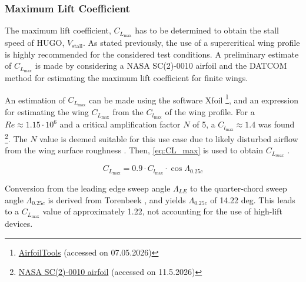 \subsubsection*{Maximum Lift Coefficient}
The maximum lift coefficient, $C_{L_\text{max}}$ has to be determined to obtain the stall speed of HUGO, $V_\text{stall}$. As stated previously, the use of a supercritical wing profile is highly recommended for the considered test conditions. A preliminary estimate of  $C_{L_\text{max}}$ is made by considering a NASA SC(2)-0010 airfoil and the DATCOM method for estimating the maximum lift coefficient for finite wings. 

An estimation of $C_{L_\text{max}}$ can be made using the software Xfoil \footnote{\href{http://airfoiltools.com/polar/details?polar=xf-sc20412-il-500000-n5}{AirfoilTools} (accessed on 07.05.2026)}, and an expression for estimating the wing $C_{L_\text{max}}$ from the $C_{l_\text{max}}$ of the wing profile. For a $Re \approx 1.15\cdot10^6$ and a critical amplification factor $N$ of 5, a $C_{l_\text{max}} \approx 1.4$ was found \footnote{\href{http://www.airfoiltools.com/polar/details?polar=xf-sc20010-il-1000000-n5}{NASA SC(2)-0010 airfoil} (accessed on 11.5.2026)}. The $N$ value is deemed suitable for this use case due to likely disturbed airflow from the wing surface roughness \cite{Koul}. Then, \autoref{eq:CL_max} is used to obtain $C_{L_{max}}$ \cite[p. 153]{Torenbeek1982}.

\begin{equation}
    C_{L_{\max}} = 0.9 \cdot C_{l_{\max}} \cdot \cos\Lambda_{0.25c}
    \label{eq:CL_max}
\end{equation}

Conversion from the leading edge sweep angle $\Lambda_{LE}$ to the quarter-chord sweep angle $\Lambda_{0.25c}$ is derived from Torenbeek
\cite[p. 440]{Torenbeek1982}, and yields $\Lambda_{0.25c}$ of 14.22 deg. This leads to a $C_{L_{\max}}$ value of approximately 1.22, not accounting for the use of high-lift devices.

